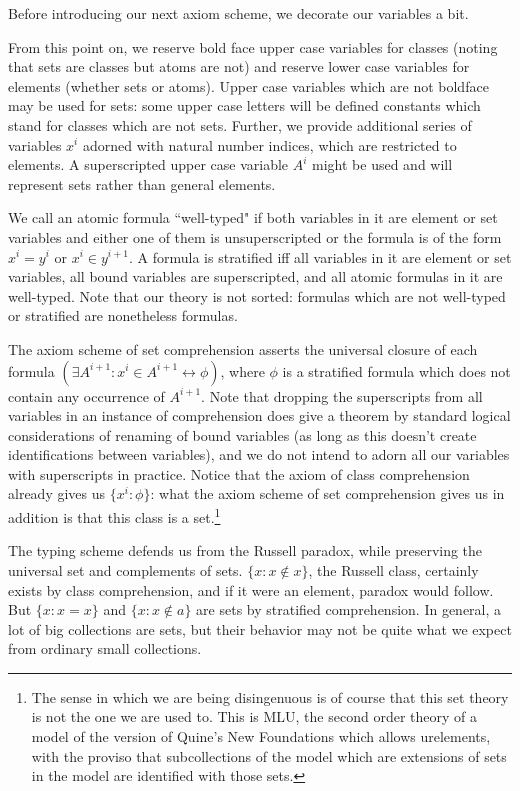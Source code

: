 \documentclass[12pt]{article}
\begin{document}
Before introducing our next axiom scheme, we decorate our variables a bit.

From this point on, we reserve bold face upper case variables for classes (noting that sets are classes but atoms are not)  and reserve lower case variables for elements (whether sets or atoms).  Upper case variables which are not boldface may be used for sets:  some upper case letters will be defined constants which stand for classes which are not sets.   Further, we provide additional series of variables $x^i$ adorned with natural number indices, which are  restricted to elements.  A superscripted upper case variable $A^i$ might be used and will represent sets rather than general elements.

We call an atomic formula ``well-typed" if both variables in it are element or set variables and either one of them is unsuperscripted or the formula is of the form
$x^i = y^i$ or $x^i \in y^{i+1}$.  A formula is stratified iff all variables in it are element or set variables, all bound variables are superscripted, and all atomic formulas in it are well-typed.
Note that our theory is not sorted:  formulas which are not well-typed or stratified are nonetheless formulas.

The axiom scheme of set comprehension asserts the universal closure of each formula $(\exists A^{i+1}:x^i \in A^{i+1} \leftrightarrow \phi)$, where $\phi$ is a stratified formula
which does not contain any occurrence of $A^{i+1}$.  Note that dropping the superscripts from all variables in an instance of comprehension does give a theorem by standard logical considerations of renaming of bound variables (as long as this doesn't create identifications between variables), and we do not intend to adorn all our variables with superscripts in practice.  Notice that the axiom of class comprehension already
gives us $\{x^i:\phi\}$:  what the axiom scheme of set comprehension gives us in addition is that this class is a set.\footnote{The sense in which we are being disingenuous is of course that this set theory is not the one we are used to.  This is MLU, the second order theory of a model of the version of Quine's New Foundations which allows urelements, with the proviso that subcollections of the model which are extensions of sets in the model are identified with those sets.}

The typing scheme defends us from the Russell paradox, while preserving the universal set and complements of sets.  $\{x:x \not\in x\}$, the Russell class, certainly exists by class comprehension, and if it were an element, paradox would follow.  But $\{x : x = x\}$ and $\{x : x \not\in a\}$ are sets by stratified comprehension.  In general, a lot of big collections are sets, but their behavior may not be quite what we expect from ordinary small collections.
\end{document}
